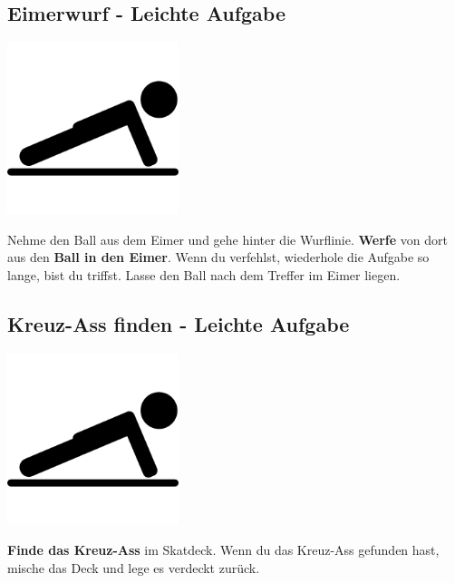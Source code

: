 \subsection{Eimerwurf - Leichte Aufgabe}
\vfill
\begin{center}
    \includegraphics[height=5cm]{graphics/push_up.png}
\end{center}
\vfill
Nehme den Ball aus dem Eimer und gehe hinter die Wurflinie.
\textbf{Werfe} von dort aus den \textbf{Ball in den Eimer}.
Wenn du verfehlst, wiederhole die Aufgabe so lange, bist du triffst.
Lasse den Ball nach dem Treffer im Eimer liegen.
\newline
\newpage

\subsection{Kreuz-Ass finden - Leichte Aufgabe}
\vfill
\begin{center}
    \includegraphics[height=5cm]{graphics/push_up.png}
\end{center}
\vfill
\textbf{Finde das Kreuz-Ass} im Skatdeck.
Wenn du das Kreuz-Ass gefunden hast, mische das Deck und lege es verdeckt
zurück.
\newline
\newpage

